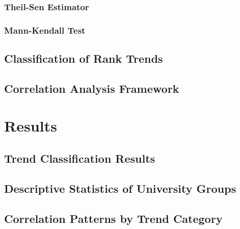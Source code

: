 \documentclass{singlecol-new}
\theoremstyle{TH}{
\newtheorem{lemma}{Lemma}
\newtheorem{theorem}[lemma]{Theorem}
\newtheorem{corrolary}[lemma]{Corrolary}
\newtheorem{conjecture}[lemma]{Conjecture}
\newtheorem{proposition}[lemma]{Proposition}
\newtheorem{claim}[lemma]{Claim}
\newtheorem{stheorem}[lemma]{Wrong Theorem}
\newtheorem{algorithm}{Algorithm}
}
\theoremstyle{THrm}{
\newtheorem{definition}{Definition}[section]
\newtheorem{question}{Question}[section]
\newtheorem{remark}{Remark}
\newtheorem{scheme}{Scheme}
}
\theoremstyle{THhit}{
\newtheorem{case}{Case}[section]
}
\begin{document}
\subsubsection{Theil-Sen Estimator}
\subsubsection{Mann-Kendall Test}
\subsection{Classification of Rank Trends}
\subsection{Correlation Analysis Framework}

\section{Results}
\subsection{Trend Classification Results}
\subsection{Descriptive Statistics of University Groups}
\subsection{Correlation Patterns by Trend Category}
\end{document}
